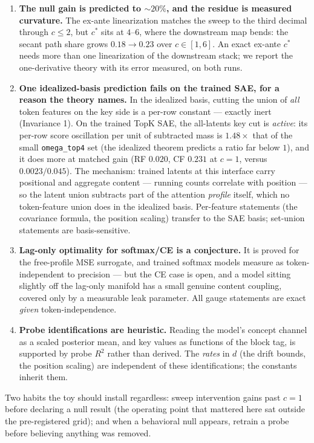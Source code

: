 \documentclass{article}
\begin{document}
\begin{enumerate}
    \item \textbf{The null gain is predicted to $\sim 20\%$, and the residue is measured curvature.} The ex-ante linearization matches the sweep to the third decimal through $c \le 2$, but $c^*$ sits at $4$--$6$, where the downstream map bends: the secant path share grows $0.18 \to 0.23$ over $c \in [1, 6]$. An exact ex-ante $c^*$ needs more than one linearization of the downstream stack; we report the one-derivative theory with its error measured, on both runs.
    \item \textbf{One idealized-basis prediction fails on the trained SAE, for a reason the theory names.} In the idealized basis, cutting the union of \emph{all} token features on the key side is a per-row constant --- exactly inert (Invariance 1). On the trained TopK SAE, the all-latents key cut is \emph{active}: its per-row score oscillation per unit of subtracted mass is $1.48\times$ that of the small \texttt{omega\_top4} set (the idealized theorem predicts a ratio far below $1$), and it does more at matched gain (RF $0.020$, CF $0.231$ at $c = 1$, versus $0.0023/0.045$). The mechanism: trained latents at this interface carry positional and aggregate content --- running counts correlate with position --- so the latent union subtracts part of the attention \emph{profile} itself, which no token-feature union does in the idealized basis. Per-feature statements (the covariance formula, the position scaling) transfer to the SAE basis; set-union statements are basis-sensitive.
    \item \textbf{Lag-only optimality for softmax/CE is a conjecture.} It is proved for the free-profile MSE surrogate, and trained softmax models measure as token-independent to precision --- but the CE case is open, and a model sitting slightly off the lag-only manifold has a small genuine content coupling, covered only by a measurable leak parameter. All gauge statements are exact \emph{given} token-independence.
    \item \textbf{Probe identifications are heuristic.} Reading the model's concept channel as a scaled posterior mean, and key values as functions of the block tag, is supported by probe $R^2$ rather than derived. The \emph{rates} in $d$ (the drift bounds, the position scaling) are independent of these identifications; the constants inherit them.
\end{enumerate}

Two habits the toy should install regardless: sweep intervention gains past $c = 1$ before declaring a null result (the operating point that mattered here sat outside the pre-registered grid); and when a behavioral null appears, retrain a probe before believing anything was removed.
\end{document}
